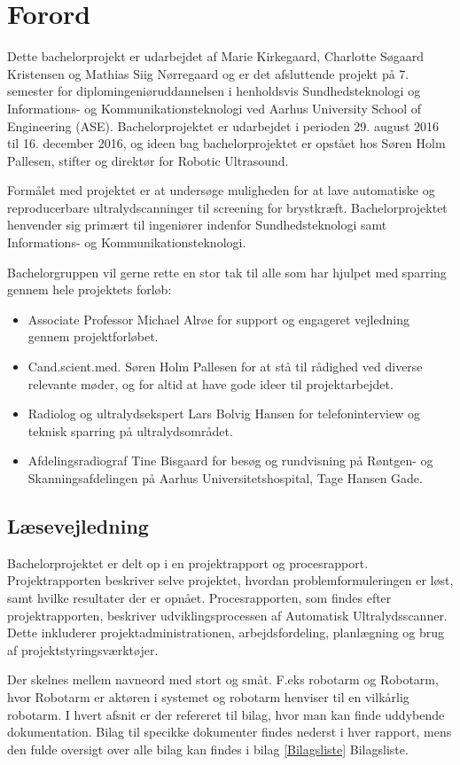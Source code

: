 \chapter{Forord}
Dette bachelorprojekt er udarbejdet af Marie Kirkegaard, Charlotte Søgaard Kristensen og Mathias Siig Nørregaard og er det afsluttende projekt på 7. semester for diplomingeniøruddannelsen i henholdsvis Sundhedsteknologi og Informations- og Kommunikationsteknologi ved Aarhus University School of Engineering (ASE). Bachelorprojektet er udarbejdet i perioden 29. august 2016 til 16. december 2016, og ideen bag bachelorprojektet er opstået hos Søren Holm Pallesen, stifter og direktør for Robotic Ultrasound. 

Formålet med projektet er at undersøge muligheden for at lave automatiske og reproducerbare ultralydscanninger til screening for brystkræft. Bachelorprojektet henvender sig primært til ingeniører indenfor Sundhedsteknologi samt Informations- og  Kommunikationsteknologi. 

Bachelorgruppen vil gerne rette en stor tak til alle som har hjulpet med sparring gennem hele projektets forløb:

\let\labelitemi\labelitemii
\begin{itemize}
\item Associate Professor Michael Alrøe for support og engageret vejledning gennem projektforløbet.

\item Cand.scient.med. Søren Holm Pallesen for at stå til rådighed ved diverse relevante møder, og for altid at have gode ideer til projektarbejdet.

\item Radiolog og ultralydsekspert Lars Bolvig Hansen for telefoninterview og teknisk sparring på ultralydsområdet.

\item Afdelingsradiograf Tine Bisgaard for besøg og rundvisning på Røntgen- og Skanningsafdelingen på Aarhus Universitetshospital, Tage Hansen Gade. 
\end{itemize}

\section{Læsevejledning} 
Bachelorprojektet er delt op i en projektrapport og procesrapport. Projektrapporten beskriver selve projektet, hvordan problemformuleringen er løst, samt hvilke resultater der er opnået. Procesrapporten, som findes efter projektrapporten, beskriver udviklingsprocessen af Automatisk Ultralydsscanner. Dette inkluderer projektadministrationen, arbejdsfordeling, planlægning og brug af projektstyringsværktøjer.

Der skelnes mellem navneord med stort og småt. F.eks robotarm og Robotarm, hvor Robotarm er aktøren i systemet og robotarm henviser til en vilkårlig robotarm.
I hvert afsnit er der refereret til bilag, hvor man kan finde uddybende dokumentation. Bilag til specikke dokumenter findes nederst i hver rapport, mens den fulde oversigt over alle bilag kan findes i bilag \ref{Bilagsliste} Bilagsliste.  

